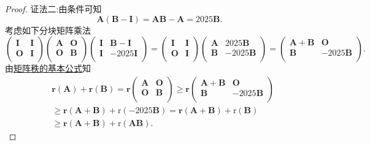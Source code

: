 \documentclass[../../main.tex]{subfiles}%
\begin{document}
\begin{proof}
{\color{blue}证法二:}由条件可知
$$\boldsymbol{A}\left( \boldsymbol{B}-\boldsymbol{I} \right) =\boldsymbol{AB}-\boldsymbol{A}=2025\boldsymbol{B}.$$
考虑如下分块矩阵乘法
$$\left( \begin{matrix}
\boldsymbol{I}&		\boldsymbol{I}\\
\boldsymbol{O}&		\boldsymbol{I}\\
\end{matrix} \right) \left( \begin{matrix}
\boldsymbol{A}&		\boldsymbol{O}\\
\boldsymbol{O}&		\boldsymbol{B}\\
\end{matrix} \right) \left( \begin{matrix}
\boldsymbol{I}&		\boldsymbol{B}-\boldsymbol{I}\\
\boldsymbol{I}&		-2025\boldsymbol{I}\\
\end{matrix} \right) =\left( \begin{matrix}
\boldsymbol{I}&		\boldsymbol{I}\\
\boldsymbol{O}&		\boldsymbol{I}\\
\end{matrix} \right) \left( \begin{matrix}
\boldsymbol{A}&		2025\boldsymbol{B}\\
\boldsymbol{B}&		-2025\boldsymbol{B}\\
\end{matrix} \right) =\left( \begin{matrix}
\boldsymbol{A}+\boldsymbol{B}&		\boldsymbol{O}\\
\boldsymbol{B}&		-2025\boldsymbol{B}\\
\end{matrix} \right) .$$
由\hyperref[proposition:矩阵秩的基本公式]{矩阵秩的基本公式}知
\begin{align*}
&\mathbf{r}\left( \boldsymbol{A} \right) +\mathbf{r}\left( \boldsymbol{B} \right) =\mathbf{r}\left( \begin{matrix}
\boldsymbol{A}&		\boldsymbol{O}\\
\boldsymbol{O}&		\boldsymbol{B}\\
\end{matrix} \right) \geqslant \mathbf{r}\left( \begin{matrix}
\boldsymbol{A}+\boldsymbol{B}&		\boldsymbol{O}\\
\boldsymbol{B}&		-2025\boldsymbol{B}\\
\end{matrix} \right) 
\\
&\geqslant \mathbf{r}\left( \boldsymbol{A}+\boldsymbol{B} \right) +\mathrm{r}\left( -2025\boldsymbol{B} \right) =\mathbf{r}\left( \boldsymbol{A}+\boldsymbol{B} \right) +\mathrm{r}\left( \boldsymbol{B} \right) 
\\
&\geqslant \mathbf{r}\left( \boldsymbol{A}+\boldsymbol{B} \right) +\mathrm{r}\left( \boldsymbol{AB} \right) .
\end{align*}
\end{proof}
\end{document}
